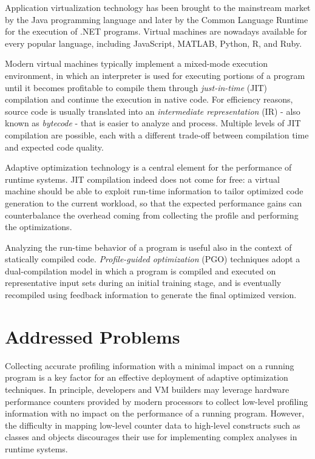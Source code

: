 Application virtualization technology has been brought to the mainstream market by the Java programming language and later by the Common Language Runtime for the execution of .NET programs. Virtual machines are nowadays available for every popular language, including JavaScript, MATLAB, Python, R, and Ruby.

Modern virtual machines typically implement a mixed-mode execution environment, in which an interpreter is used for executing portions of a program until it becomes profitable to compile them through {\em just-in-time} (JIT) compilation and continue the execution in native code. For efficiency reasons, source code is usually translated into an {\em intermediate representation} (IR) - also known as {\em bytecode} - that is easier to analyze and process. Multiple levels of JIT compilation are possible, each with a different trade-off between compilation time and expected code quality.

Adaptive optimization technology is a central element for the performance of runtime systems. JIT compilation indeed does not come for free: a virtual machine should be able to exploit run-time information to tailor optimized code generation to the current workload, so that the expected performance gains can counterbalance the overhead coming from collecting the profile and performing the optimizations.

Analyzing the run-time behavior of a program is useful also in the context of statically compiled code. {\em Profile-guided optimization} (PGO) techniques adopt a dual-compilation model in which a program is compiled and executed on representative input sets during an initial training stage, and is eventually recompiled using feedback information to generate the final optimized version.

\section{Addressed Problems}

Collecting accurate profiling information with a minimal impact on a running program is a key factor for an effective deployment of adaptive optimization techniques. In principle, developers and VM builders may leverage hardware performance counters provided by modern processors to collect low-level profiling information with no impact on the performance of a running program. However, the difficulty in mapping low-level counter data to high-level constructs such as classes and objects discourages their use for implementing complex analyses in runtime systems.

